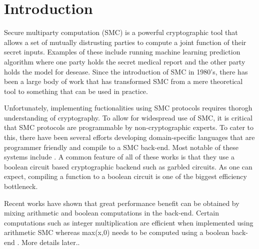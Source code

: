 \section{Introduction}
\label{sec:intro}

Secure multiparty computation \cite{yao,gmw} (SMC) is a powerful cryptographic tool that allows a set of mutually distrusting parties to compute a joint function of their secret inputs. Examples of these include running machine learning prediction algorithm where one party holds the secret medical report and the other party holds the model for desease. Since the introduction of SMC in 1980's, there has been a large body of work \cite{..} that has transformed SMC from a mere theoretical tool to something that can be used in practice. 

Unfortunately, implementing fuctionalities using SMC protocols requires thorogh understanding of cryptography. To allow for widespread use of SMC, it is critical that SMC protocols are programmable by non-cryptographic experts. To cater to this, there have been several efforts developing domain-specific languages that are programmer friendly and compile to a SMC back-end. Most notable of these systems include \cite{...}. A common feature of all of these works is that they use a boolean circuit based cryptographic backend such as garbled circuits. As one can expect, compiling a function to a boolean circuit is one of the biggest efficiency bottleneck. 

Recent works \cite{aby,secureml,minion} have shown that great performance benefit can be obtained by mixing arithmetic and boolean computations in the back-end. Certain computations such as integer multiplication are efficient when implemented using arithmetic SMC \cite{gmw} whereas max(x,0) needs to be computed using a boolean back-end \cite{yao}. More details later.. 



\cite{lambdaps,wysteria}